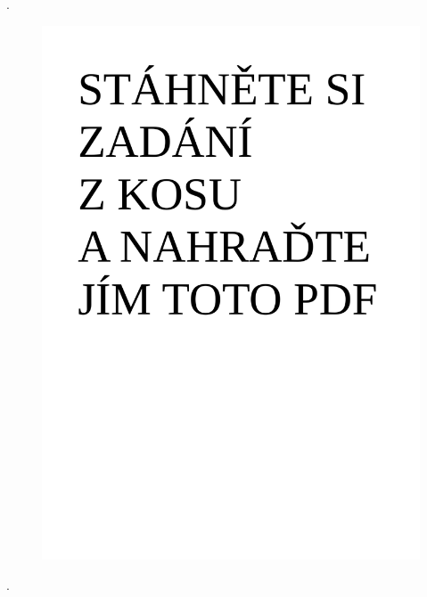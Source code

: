\thispagestyle{empty} \addtocounter{page}{-1}
.\newpage
\thispagestyle{empty} \addtocounter{page}{-1}
\begin{figure}[H]
      \centering
      \includegraphics[width=1\textwidth]{Images/zav_prace.pdf}
\end{figure}
\newpage
.
\restoregeometry

\newcommand{\cvut}{České vysoké učení technické v~Praze}
\newcommand{\fs}{Fakulta strojní}
\newcommand{\um}{Ústav mechaniky tekutin a~termodynamiky}
\newcommand{\program}{Aplikované vědy ve strojním inženýrství} %
\newcommand{\obor}{Aplikovaná mechanika} %

\newcommand{\druh}{Diplomová práce} %
\newcommand{\nazevcz}{český název práce (přesně podle zadání!)}    %
\newcommand{\nazeven}{anglický název práce (přesně podle zadání!)}          %
\newcommand{\autor}{Autor}   %
\newcommand{\vedouci}{vedoucí} %
\newcommand{\pracovisteVed}{\um, \\ \fs, \cvut} %
\newcommand{\konzultant}{--} %
\newcommand{\pracovisteKonz}{--} %

